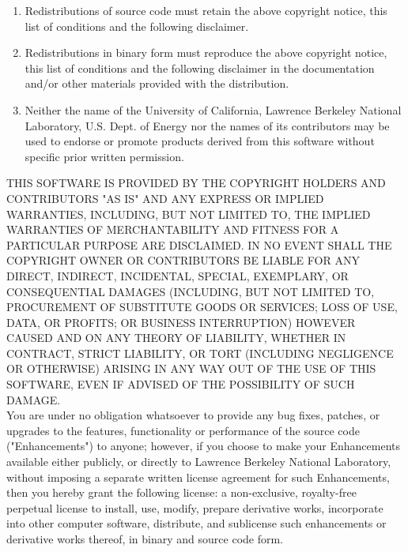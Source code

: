 \documentclass{article}
\begin{document}
\begin{enumerate}
\item Redistributions of source code must retain the above copyright
  notice, this list of conditions and the following disclaimer.

\item Redistributions in binary form must reproduce the above
  copyright notice, this list of conditions and the following
  disclaimer in the documentation and/or other materials provided with
  the distribution.

\item Neither the name of the University of California, Lawrence
  Berkeley National Laboratory, U.S. Dept. of Energy nor the names of
  its contributors may be used to endorse or promote products derived
  from this software without specific prior written permission.
\end{enumerate}

THIS SOFTWARE IS PROVIDED BY THE COPYRIGHT HOLDERS AND CONTRIBUTORS
"AS IS" AND ANY EXPRESS OR IMPLIED WARRANTIES, INCLUDING, BUT NOT
LIMITED TO, THE IMPLIED WARRANTIES OF MERCHANTABILITY AND FITNESS
FOR A PARTICULAR PURPOSE ARE DISCLAIMED. IN NO EVENT SHALL THE
COPYRIGHT OWNER OR CONTRIBUTORS BE LIABLE FOR ANY DIRECT, INDIRECT,
INCIDENTAL, SPECIAL, EXEMPLARY, OR CONSEQUENTIAL DAMAGES (INCLUDING,
BUT NOT LIMITED TO, PROCUREMENT OF SUBSTITUTE GOODS OR SERVICES;
LOSS OF USE, DATA, OR PROFITS; OR BUSINESS INTERRUPTION) HOWEVER
CAUSED AND ON ANY THEORY OF LIABILITY, WHETHER IN CONTRACT, STRICT
LIABILITY, OR TORT (INCLUDING NEGLIGENCE OR OTHERWISE) ARISING IN
ANY WAY OUT OF THE USE OF THIS SOFTWARE, EVEN IF ADVISED OF THE
POSSIBILITY OF SUCH DAMAGE.\\

You are under no obligation whatsoever to provide any bug fixes,
patches, or upgrades to the features, functionality or performance
of the source code ("Enhancements") to anyone; however, if you
choose to make your Enhancements available either publicly, or
directly to Lawrence Berkeley National Laboratory, without imposing
a separate written license agreement for such Enhancements, then you
hereby grant the following license: a non-exclusive, royalty-free
perpetual license to install, use, modify, prepare derivative works,
incorporate into other computer software, distribute, and sublicense
such enhancements or derivative works thereof, in binary and source
code form.



\end{document}
